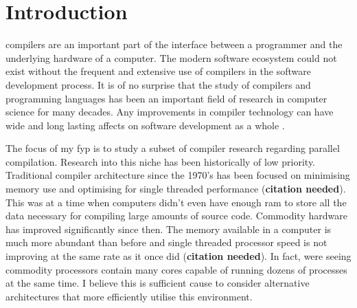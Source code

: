 \chapter{Introduction} \label{introduction}

\Glspl{compiler} are an important part of the interface between a programmer
and the underlying hardware of a computer. The modern software ecosystem
could not exist without the frequent and extensive use of compilers in
the software development process. It is of no surprise that the study of
compilers and programming languages has been an important field of research
in computer science for many decades. Any improvements in compiler technology
can have wide and long lasting affects on software development as a whole
\citep{hall_compiler_2009}.

The focus of my \gls{fyp} is to study a subset of compiler research regarding
parallel compilation. Research into this niche has been historically of low
priority. Traditional compiler architecture since the 1970’s has been focused
on minimising memory use and optimising for single threaded performance
(\textbf{citation needed}). This was at a time when computers didn’t even have
enough \gls{ram} to store all the data necessary for compiling large amounts
of source code. Commodity hardware has improved significantly since then. The
memory available in a computer is much more abundant than before and single
threaded processor speed is not improving at the same rate as it once did
(\textbf{citation needed}). In fact, were seeing commodity processors contain
many cores capable of running dozens of processes at the same time. I believe
this is sufficient cause to consider alternative architectures that more
efficiently utilise this environment.

